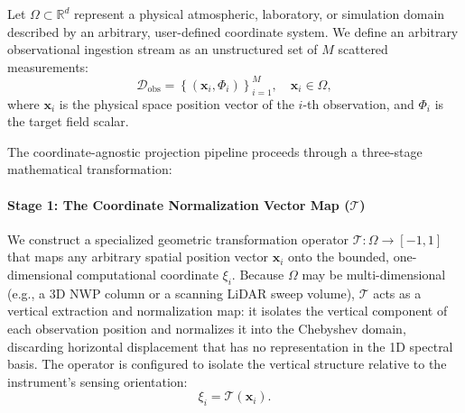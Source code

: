 \documentclass[11pt,a4paper]{article}
\begin{document}
Let $\Omega \subset \mathbb{R}^d$ represent a physical atmospheric, laboratory, or simulation domain described by an arbitrary, user-defined coordinate system. We define an arbitrary observational ingestion stream as an unstructured set of $M$ scattered measurements:
\begin{equation}
\mathcal{D}_{\mathrm{obs}} = \left\{ \left(\mathbf{x}_i, \Phi_i\right) \right\}_{i=1}^M, \quad \mathbf{x}_i \in \Omega,
\label{eq:scattered_data_set}
\end{equation}
where $\mathbf{x}_i$ is the physical space position vector of the $i$-th observation, and $\Phi_i$ is the target field scalar.

The coordinate-agnostic projection pipeline proceeds through a three-stage mathematical transformation:

\paragraph{Stage 1: The Coordinate Normalization Vector Map ($\mathcal{T}$)}
We construct a specialized geometric transformation operator $\mathcal{T}: \Omega \rightarrow [-1, 1]$ that maps any arbitrary spatial position vector $\mathbf{x}_i$ onto the bounded, one-dimensional computational coordinate $\xi_i$. Because $\Omega$ may be multi-dimensional (e.g., a 3D NWP column or a scanning LiDAR sweep volume), $\mathcal{T}$ acts as a vertical extraction and normalization map: it isolates the vertical component of each observation position and normalizes it into the Chebyshev domain, discarding horizontal displacement that has no representation in the 1D spectral basis. The operator is configured to isolate the vertical structure relative to the instrument's sensing orientation:
\begin{equation}
\xi_i = \mathcal{T}(\mathbf{x}_i).
\label{eq:generalized_tau_map}
\end{equation}
\end{document}
